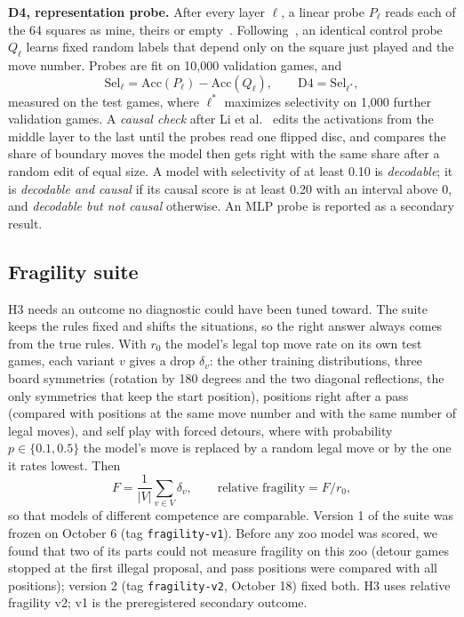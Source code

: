 \documentclass[journal]{IEEEtran}
\begin{document}
\textbf{D4, representation probe.} After every layer $\ell$, a linear probe $P_\ell$ reads each of the 64 squares
as mine, theirs or empty~\cite{nanda2023emergent}. Following~\cite{hewitt2019control}, an identical control probe
$Q_\ell$ learns fixed random labels that depend only on the square just played and the move number. Probes are fit
on 10,000 validation games, and
\begin{equation}
  \mathrm{Sel}_\ell=\mathrm{Acc}(P_\ell)-\mathrm{Acc}(Q_\ell),\qquad \mathrm{D4}=\mathrm{Sel}_{\ell^{*}},
\end{equation}
measured on the test games, where $\ell^{*}$ maximizes selectivity on 1,000 further validation games. A \emph{causal check} after
Li et al.~\cite{li2023othello} edits the activations from the middle layer to the last until the probes read one
flipped disc, and compares the share of boundary moves the model then gets right with the same share after a random
edit of equal size. A model with selectivity of at least 0.10 is \emph{decodable}; it is \emph{decodable and causal}
if its causal score is at least 0.20 with an interval above 0, and \emph{decodable but not causal} otherwise. An MLP
probe is reported as a secondary result.

\subsection{Fragility suite}
\label{sec:fragility}
H3 needs an outcome no diagnostic could have been tuned toward. The suite keeps the rules fixed and shifts the
situations, so the right answer always comes from the true rules. With $r_0$ the model's legal top move rate on its
own test games, each variant $v$ gives a drop $\delta_v$: the other training distributions, three board symmetries
(rotation by 180 degrees and the two diagonal reflections, the only symmetries that keep the start position),
positions right after a pass (compared with positions at the same move number and with the same number of legal
moves), and self play with forced detours, where with probability $p\in\{0.1, 0.5\}$ the model's move is replaced by
a random legal move or by the one it rates lowest. Then
\begin{equation}
  F=\frac{1}{|V|}\sum_{v\in V}\delta_v,\qquad \text{relative fragility}=F/r_0,
\end{equation}
so that models of different competence are comparable. Version 1 of the suite was frozen on October 6 (tag
\texttt{fragility-v1}). Before any zoo model was scored, we found that two of its parts could not measure fragility
on this zoo (detour games stopped at the first illegal proposal, and pass positions were compared with all
positions); version 2 (tag \texttt{fragility-v2}, October 18) fixed both. H3 uses relative fragility v2; v1 is the
preregistered secondary outcome.
\end{document}

